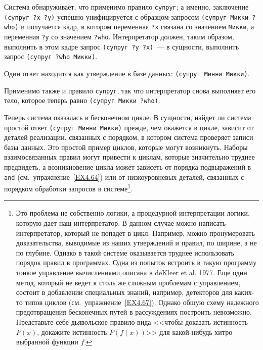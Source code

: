 \begin{plainlist}
\item
Система обнаруживает, что применимо правило
{\tt супруг}; а именно, заключение {\tt (су\-пруг ?x ?y)}
успешно унифицируется с образцом-запросом {\tt (су\-пруг Микки
?who)} и получается кадр, в котором переменная {\tt ?x}
связана со значением {\tt Микки}, а переменная {\tt ?y}
со значением {\tt ?who}.  Интерпретатор должен, таким образом,
выполнить в этом кадре запрос {\tt (супруг ?y ?x)}~--- в
сущности, выполнить запрос {\tt (супруг ?who Микки)}.

\item
Один ответ находится как утверждение в базе данных:
{\tt (супруг Минни Микки)}.

\item
Применимо также и правило {\tt супруг}, так
что интерпретатор снова выполняет его тело, которое теперь равно
{\tt (супруг Микки ?who)}.
\end{plainlist}
Теперь система оказалась в бесконечном цикле.  В сущности, найдет ли
система простой ответ {\tt (супруг Минни Микки)} прежде, чем
окажется в цикле, зависит от деталей реализации, связанных с порядком,
в котором система проверяет записи базы данных.  Это простой пример
циклов, которые могут возникнуть.  Наборы взаимосвязанных правил могут
привести к циклам, которые значительно труднее предвидеть, а
возникновение  цикла может зависеть от порядка подвыражений в
{\tt and} (см.~упражнение~\ref{EX4.64}) или от
низкоуровневых деталей, связанных с порядком обработки запросов в
системе\footnote{Это проблема не собственно логики, а процедурной интерпретации
логики, которую дает наш интерпретатор.  В данном случае можно написать
интерпретатор, который не попадет в цикл. Например, можно
пронумеровать доказательства, выводимые из наших утверждений и правил,
по ширине, а не по глубине.  Однако в такой системе оказывается
труднее использовать порядок правил в программах.  Одна из попыток
встроить в такую программу тонкое управление вычислениями описана в
deKleer et al. 1977.
Еще один метод, который не ведет
к столь же сложным проблемам с управлением, состоит в добавлении
специальных знаний, например, детекторов для каких-то типов циклов
(см.~упражнение~\ref{EX4.67}).  Однако общую схему
надежного предотвращения бесконечных путей в рассуждениях построить
невозможно.  Представьте себе дьявольское правило вида <<чтобы
доказать истинность $P(x)$, докажите истинность
$P(f(x))$>> для какой-нибудь хитро выбранной функции
$f$.}.

